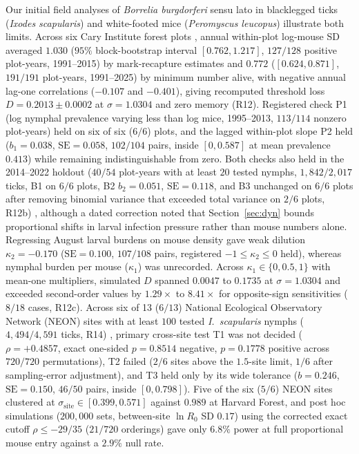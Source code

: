 Our initial field analyses of \textit{Borrelia burgdorferi} sensu lato in blacklegged ticks (\textit{Ixodes scapularis}) and white-footed mice (\textit{Peromyscus leucopus}) illustrate both limits. Across six Cary Institute forest plots \citep{ostfeld20182019,ostfeld2026b}, annual within-plot log-mouse SD averaged $1.030$ ($95\%$ block-bootstrap interval $[0.762, 1.217]$, $127/128$ positive plot-years, 1991--2015) by mark-recapture estimates and $0.772$ ($[0.624, 0.871]$, $191/191$ plot-years, 1991--2025) by minimum number alive, with negative annual lag-one correlations ($-0.107$ and $-0.401$), giving recomputed threshold loss $D = 0.2013 \pm 0.0002$ at $\sigma = 1.0304$ and zero memory (R12). Registered check P1 (log nymphal prevalence varying less than log mice, 1995--2013, $113/114$ nonzero plot-years) held on six of six ($6/6$) plots, and the lagged within-plot slope P2 held ($b_1 = 0.038$, $\mathrm{SE} = 0.058$, $102/104$ pairs, inside $[0, 0.587]$ at mean prevalence $0.413$) while remaining indistinguishable from zero. Both checks also held in the 2014--2022 holdout ($40/54$ plot-years with at least $20$ tested nymphs, $1{,}842/2{,}017$ ticks, B1 on $6/6$ plots, B2 $b_2 = 0.051$, $\mathrm{SE} = 0.118$, and B3 unchanged on $6/6$ plots after removing binomial variance that exceeded total variance on $2/6$ plots, R12b) \citep{ladeau2025}, although a dated correction noted that Section~\ref{sec:dyn} bounds proportional shifts in larval infection pressure rather than mouse numbers alone. Regressing August larval burdens on mouse density gave weak dilution $\kappa_2 = -0.170$ ($\mathrm{SE} = 0.100$, $107/108$ pairs, registered $-1 \le \kappa_2 \le 0$ held), whereas nymphal burden per mouse ($\kappa_1$) was unrecorded. Across $\kappa_1 \in \{0, 0.5, 1\}$ with mean-one multipliers, simulated $D$ spanned $0.0047$ to $0.1735$ at $\sigma = 1.0304$ and exceeded second-order values by $1.29\times$ to $8.41\times$ for opposite-sign sensitivities ($8/18$ cases, R12c). Across six of 13 ($6/13$) National Ecological Observatory Network (NEON) sites with at least $100$ tested \textit{I.~scapularis} nymphs ($4{,}494/4{,}591$ ticks, R14) \citep{neon2026a,neon2026b,neon2026c}, primary cross-site test T1 was not decided ($\rho = +0.4857$, exact one-sided $p = 0.8514$ negative, $p = 0.1778$ positive across $720/720$ permutations), T2 failed ($2/6$ sites above the $1.5$-site limit, $1/6$ after sampling-error adjustment), and T3 held only by its wide tolerance ($b = 0.246$, $\mathrm{SE} = 0.150$, $46/50$ pairs, inside $[0, 0.798]$). Five of the six ($5/6$) NEON sites clustered at $\sigma_{\mathrm{site}} \in [0.399, 0.571]$ against $0.989$ at Harvard Forest, and post hoc simulations ($200{,}000$ sets, between-site $\ln R_0$ SD $0.17$) using the corrected exact cutoff $\rho \le -29/35$ ($21/720$ orderings) gave only $6.8\%$ power at full proportional mouse entry against a $2.9\%$ null rate.

